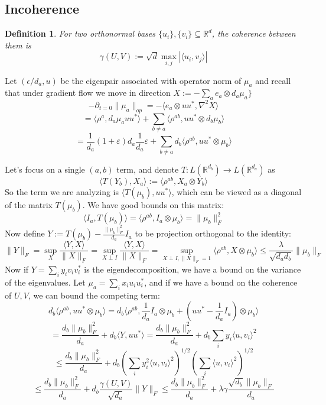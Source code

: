 \documentclass{article}
\newtheorem{definition}{Definition}
\newcommand{\R}{{\mathbb{R}}}
\newcommand\eps{\varepsilon}
\begin{document}
\subsection{Incoherence}

\begin{definition}
For two orthonormal bases $\{u_{i}\},\{v_{i}\} \subseteq \R^{d}$, the coherence between them is 
\[ \gamma(U,V) := \sqrt{d} \max_{i,j} |\langle u_{i}, v_{j} \rangle|  \]
\end{definition}

Let $(\epsilon/d_{a},u)$ be the eigenpair associated with operator norm of $\mu_{a}$ and recall that under gradient flow we move in direction $X := -\sum_{a} e_{a} \otimes d_{a} \mu_{a}\}$
\[ -\partial_{t=0} \|\mu_{a}\|_{op} = -\langle e_{a} \otimes uu^{*}, \nabla^{2} X \rangle     \]
\[ = \langle \rho^{a}, d_{a} \mu_{a} u u^{*} \rangle + \sum_{b \neq a} \langle \rho^{ab}, u u^{*} \otimes d_{b} \mu_{b} \rangle    \]
\[ = \frac{1}{d_{a}} (1+\eps) d_{a} \frac{1}{d_{a}} \eps + \sum_{b \neq a} d_{b} \langle \rho^{ab}, u u^{*} \otimes \mu_{b} \rangle   \]

Let's focus on a single $(a,b)$ term, and denote $T : L(\R^{d_{b}}) \to L(\R^{d_{a}})$ as
\[ \langle T(Y_{b}), X_{a} \rangle := \langle \rho^{ab}, X_{a} \otimes Y_{b} \rangle \]
So the term we are analyzing is $\langle T(\mu_{b}), u u^{*} \rangle$, which can be viewed as a diagonal of the matrix $T(\mu_{b})$. We have good bounds on this matrix:
\[ \langle I_{a}, T(\mu_{b}) \rangle = \langle \rho^{ab}, I_{a} \otimes \mu_{b} \rangle = \|\mu_{b}\|_{F}^{2}  \]
Now define $Y := T(\mu_{b}) - \frac{\|\mu_{b}\|_{F}^{2}}{d_{a}} I_{a}$ to be projection orthogonal to the identity:
\[ \|Y\|_{F} = \sup_{X} \frac{ \langle Y,X \rangle }{\|X\|_{F}} = \sup_{X \perp I} \frac{ \langle Y, X \rangle }{\|X\|_{F}} = \sup_{X \perp I, \|X\|_{F} = 1} \langle \rho^{ab}, X \otimes \mu_{b} \rangle \leq \frac{\lambda}{\sqrt{d_{a} d_{b}}} \|\mu_{b}\|_{F}     \]
Now if $Y = \sum_{i} y_{i} v_{i} v_{i}^{*}$ is the eigendecomposition, we have a bound on the variance of the eigenvalues. Let $\mu_{a} = \sum_{i} x_{i} u_{i} u_{i}^{*}$, and if we have a bound on the coherence of $U,V$, we can bound the competing term:
\[ d_{b} \langle \rho^{ab}, u u^{*} \otimes \mu_{b} \rangle = d_{b} \langle \rho^{ab}, \frac{1}{d_{a}} I_{a} \otimes \mu_{b} + (u u^{*} - \frac{1}{d_{a}} I_{a}) \otimes \mu_{b} \rangle    \]
\[ = \frac{d_{b} \|\mu_{b}\|_{F}^{2}}{d_{a}} + d_{b} \langle Y, u u^{*} \rangle  
= \frac{d_{b} \|\mu_{b}\|_{F}^{2}}{d_{a}} + d_{b} \sum_{i} y_{i} \langle u, v_{i} \rangle^{2}    \]
\[ \leq \frac{d_{b} \|\mu_{b}\|_{F}^{2}}{d_{a}} + d_{b} \left( \sum_{i} y_{i}^{2} \langle u, v_{i} \rangle^{2}  \right)^{1/2} \left( \sum_{i} \langle u, v_{i} \rangle^{2} \right)^{1/2}   \]
\[ \leq \frac{d_{b} \|\mu_{b}\|_{F}^{2}}{d_{a}} + d_{b} \frac{\gamma(U,V)}{\sqrt{d_{a}}} \|Y\|_{F} 
\leq \frac{d_{b} \|\mu_{b}\|_{F}^{2}}{d_{a}} + \lambda \gamma \frac{\sqrt{d_{b}} \|\mu_{b}\|_{F}}{d_{a}}    \]
\end{document}
